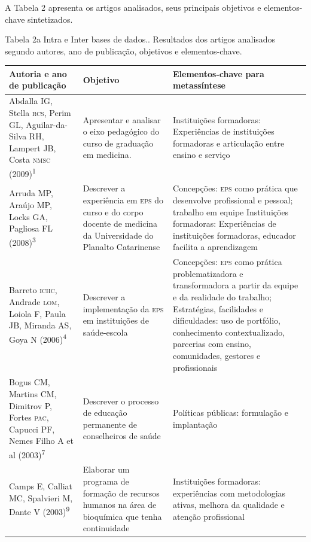\documentclass{article}
\begin{document}
A Tabela 2 apresenta os artigos analisados, seus principais objetivos e
elementos-chave sintetizados.

Tabela 2a Intra e Inter bases de dados.. Resultados dos artigos analisados segundo autores, ano de publicação,
objetivos e elementos-chave.

\begin{table}
\begin{xtabular}{ l | l | l }
\hline
Autoria e ano de publicação & Objetivo & Elementos-chave para metassíntese\\
\hline
Abdalla IG, Stella \textsc{rcs}, Perim GL, Aguilar-da-Silva RH, Lampert JB, Costa \textsc{nmsc}
(2009)\textsuperscript{1}

& Apresentar e analisar o eixo pedagógico do curso de graduação em medicina.
& Instituições formadoras: Experiências de instituições formadoras e articulação
entre ensino e serviço
\\ \hline

Arruda MP, Araújo MP, Locks GA, Pagliosa FL (2008)\textsuperscript{3}

& Descrever a experiência em \textsc{eps} do curso e do corpo docente de medicina da
Universidade do Planalto Catarinense
& Concepções: \textsc{eps} como prática que desenvolve profissional e pessoal; trabalho
em equipe Instituições formadoras: Experiências de instituições formadoras,
educador facilita a aprendizagem
\\ \hline

Barreto \textsc{ichc}, Andrade \textsc{lom}, Loiola F, Paula JB, Miranda AS, Goya N (2006)\textsuperscript{4}

& Descrever a implementação da \textsc{eps} em instituições de saúde-escola
& Concepções: \textsc{eps} como prática problematizadora e transformadora a partir da
equipe e da realidade do trabalho; Estratégias, facilidades e dificuldades: uso
de portfólio, conhecimento contextualizado, parcerias com ensino, comunidades,
gestores e profissionais
\\ \hline

Bogus CM, Martins CM, Dimitrov P, Fortes \textsc{pac}, Capucci PF, Nemes Filho A et al
(2003)\textsuperscript{7}

& Descrever o processo de educação permanente de conselheiros de saúde
& Políticas públicas: formulação e implantação
\\ \hline

Camps E, Calliat MC, Spalvieri M, Dante V (2003)\textsuperscript{9}

& Elaborar um programa de formação de recursos humanos na área de bioquímica que
tenha continuidade
& Instituições formadoras: experiências com metodologias ativas, melhora da
qualidade e atenção profissional
\\ \hline


\end{xtabular}
\end{table}
\end{document}
